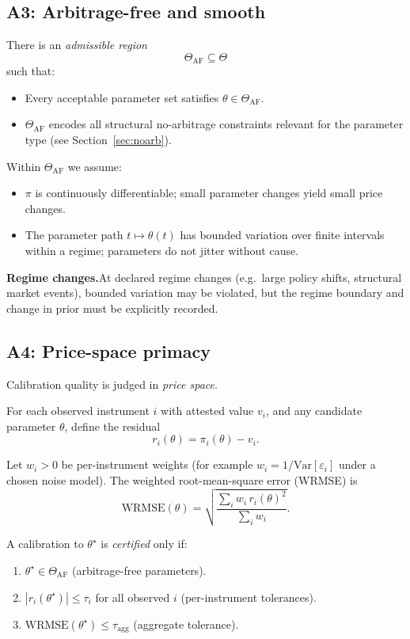 \documentclass[11pt,a4paper]{article}
\begin{document}
\subsection{A3: Arbitrage-free and smooth}

There is an \textit{admissible region}
\[
    \Theta_{\text{AF}} \subseteq \Theta
\]
such that:
\begin{itemize}
    \item Every acceptable parameter set satisfies $\theta \in \Theta_{\text{AF}}$.
    \item $\Theta_{\text{AF}}$ encodes all structural no-arbitrage constraints relevant for the parameter type (see Section~\ref{sec:noarb}).
\end{itemize}

Within $\Theta_{\text{AF}}$ we assume:
\begin{itemize}
    \item $\pi$ is continuously differentiable; small parameter changes yield small price changes.
    \item The parameter path $t \mapsto \theta(t)$ has bounded variation over finite intervals within a regime; parameters do not jitter without cause.
\end{itemize}

\textbf{Regime changes.}\quad At declared regime changes (e.g.\ large policy shifts, structural market events), bounded variation may be violated, but the regime boundary and change in prior must be explicitly recorded.

\subsection{A4: Price-space primacy}

Calibration quality is judged in \textit{price space}.

For each observed instrument $i$ with attested value $v_i$, and any candidate parameter $\theta$, define the residual
\[
    r_i(\theta) = \pi_i(\theta) - v_i.
\]

Let $w_i > 0$ be per-instrument weights (for example $w_i = 1/\text{Var}[\varepsilon_i]$ under a chosen noise model). The weighted root-mean-square error (WRMSE) is
\[
    \text{WRMSE}(\theta) = \sqrt{\frac{\sum_i w_i \, r_i(\theta)^2}{\sum_i w_i}}.
\]

A calibration to $\theta^\star$ is \textit{certified} only if:
\begin{enumerate}
    \item $\theta^\star \in \Theta_{\text{AF}}$ (arbitrage-free parameters).
    \item $|r_i(\theta^\star)| \leq \tau_i$ for all observed $i$ (per-instrument tolerances).
    \item $\text{WRMSE}(\theta^\star) \leq \tau_{\text{agg}}$ (aggregate tolerance).
\end{enumerate}
\end{document}

